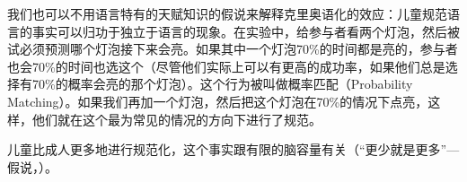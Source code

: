 我们也可以不用语言特有的天赋知识的假说来解释克里奥语化的效应：儿童规范语言的事实可以归功于独立于语言的现象。在实验中，给参与者看两个灯泡，然后被试必须预测哪个灯泡接下来会亮。如果其中一个灯泡70\%的时间都是亮的，参与者也会70\%的时间也选这个（尽管他们实际上可以有更高的成功率，如果他们总是选择有70\%的概率会亮的那个灯泡）。这个行为被叫做概率匹配（Probability Matching）。如果我们再加一个灯泡，然后把这个灯泡在70\%的情况下点亮，这样，他们就在这个最为常见的情况的方向下进行了规范\citep{Gardener57a,Weir64a}。

儿童比成人更多地进行规范化\citep{HudsonN99a,HKN2005a}，这个事实跟有限的脑容量有关（“更少就是更多”—假说，\citealp{Newport90a,Elman93a}）。

